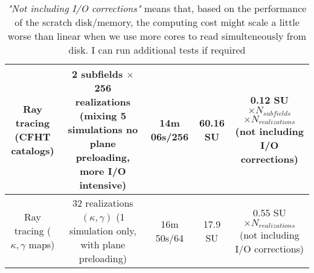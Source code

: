\documentclass[11pt]{article}
\begin{document}
\begin{table}[h!]
\begin{center}
\begin{tabular}{c|c|c|c|c}
\pbox{20cm}{Ray tracing \\(CFHT catalogs)} & \pbox{20cm}{2 subfields $\times$ 256 realizations\\ (mixing 5 simulations\\no plane preloading, \\more I/O intensive)} & 14m 06s/256 & 60.16 SU & \pbox{20cm}{0.12 SU $\times N_{subfields}$\\ $\times N_{realizations}$\\ (not including \\ I/O corrections)} \\ \hline
\pbox{20cm}{Ray tracing\\ ($\kappa,\gamma$ maps)} & \pbox{20cm}{32 realizations $(\kappa,\gamma)$ \\ (1 simulation only, \\ with plane preloading)} & 16m 50s/64 & 17.9 SU & \pbox{20cm}{0.55 SU $\times N_{realizations}$\\ (not including \\ I/O corrections)} \\ \hline
\end{tabular}
\end{center}
\caption{\textit{"Not including I/O corrections"} means that, based on the performance of the scratch disk/memory, the computing cost might scale a little worse than linear when we use more cores to read simulteneously from disk. I can run additional tests if required}
\end{table}
\end{document}
